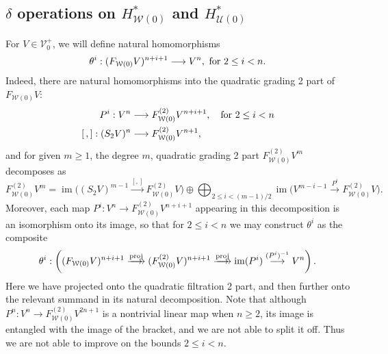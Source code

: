 \documentclass[11pt]{amsart}
\theoremstyle{plain}
\theoremstyle{definition}
\DeclareMathOperator{\im}{im}
\renewcommand{\to}{\longrightarrow}
\newcommand{\calW}{\mathcal{W}}
\newcommand{\calU}{\mathcal{U}}
\newcommand{\calV}{\mathcal{V}}
\theoremstyle{plain}
\newcommand{\vect}[2]{\calV^{#1}_{#2}}
\begin{document}
\begin{Cohomology operations for unstable Lie algebras over P}
\subsection{$\delta$ operations on $H^*_{\calW(0)}$ and $H^*_{\calU(0)}$}
For $V\in \vect{+}{0}$, we will define natural homomorphisms
\[\theta^i:(F_{\calW(0)}V)^{n+i+1}\to V^{n}, \textup{ for $2\leq i<n$}.\]
Indeed, there are natural homomorphisms into the quadratic grading 2 part of $F_{\calW(0)}V$:
\begin{align*}
P^i:V^{n}&\to F_{\calW(0)}^{(2)}V^{n+i+1}, \textup{\quad  for $2\leq i<n$}\\
[\,,]:(S_2V)^{n}&\to F_{\calW(0)}^{(2)}V^{n+1},
\end{align*}
and for given $m\geq1$, the degree $m$, quadratic grading 2 part $F_{\calW(0)}^{(2)}V^m$ decomposes as
%
\[F_{\calW(0)}^{(2)}V^{m}=%
\im \bigl((S_2V)^{m-1}\overset{[,]}{\to} F_{\calW(0)}^{(2)}V\bigr)%
\oplus\bigoplus_{\!\!\!\!\!\!2\leq i< (m-1)/2\!\!\!\!\!\!}\im \bigl(V^{m-i-1}\overset{P^i}{\to}F_{\calW(0)}^{(2)}V\bigr).\]
Moreover, each map $P^i:V^n\to F_{\calW(0)}^{(2)}V^{n+i+1}$ appearing in this decomposition is an isomorphism onto its image, so that for $2\leq i <n$ we may construct $\theta^i$ as the composite
\[\theta^i:\left((F_{\calW(0)}V)^{n+i+1}\overset{\textup{proj}}{\makebox[.06ex][l]{$\to$}\to} (F_{\calW(0)}^{(2)}V)^{n+i+1}\overset{\textup{proj}}{\makebox[.06ex][l]{$\to$}\to} \im (P^i)\overset{(P^i)^{-1}}{\to}V^{n}\right).\]
Here we have projected onto the quadratic filtration 2 part, and then further onto the relevant summand in its natural decomposition. Note that although $P^n:V^n\to F_{\calW(0)}^{(2)}V^{2n+1}$ is a nontrivial linear map when $n\geq2$, its image is entangled with the image of the bracket, and we are not able to split it off. Thus we are not able to improve on the bounds $2\leq i< n$.


\end{Cohomology operations for unstable Lie algebras over P}
\end{document}
